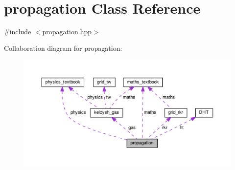 \hypertarget{classpropagation}{}\section{propagation Class Reference}
\label{classpropagation}


{\ttfamily \#include $<$propagation.\+hpp$>$}



Collaboration diagram for propagation\+:\nopagebreak
\begin{figure}[H]
\begin{center}
\leavevmode
\includegraphics[width=350pt]{classpropagation__coll__graph}
\end{center}
\end{figure}
